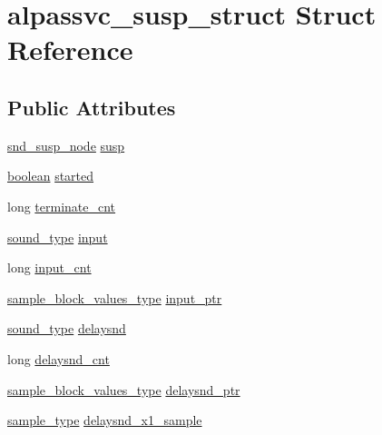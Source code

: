 \hypertarget{structalpassvc__susp__struct}{}\section{alpassvc\+\_\+susp\+\_\+struct Struct Reference}
\label{structalpassvc__susp__struct}
\subsection*{Public Attributes}
\begin{DoxyCompactItemize}
\item 
\hyperlink{sound_8h_a6b268203688a934bd798ceb55f85d4c0}{snd\+\_\+susp\+\_\+node} \hyperlink{structalpassvc__susp__struct_a609c1126e4edd7b9316992f96f955a3b}{susp}
\item 
\hyperlink{cext_8h_a7670a4e8a07d9ebb00411948b0bbf86d}{boolean} \hyperlink{structalpassvc__susp__struct_abd37d6d81e7bbba5a2f9d67c540195b8}{started}
\item 
long \hyperlink{structalpassvc__susp__struct_a9db5735c74407264e582943a8b75ad86}{terminate\+\_\+cnt}
\item 
\hyperlink{sound_8h_a792cec4ed9d6d636d342d9365ba265ea}{sound\+\_\+type} \hyperlink{structalpassvc__susp__struct_a70eda65885d15c88c119725c4bcb9a00}{input}
\item 
long \hyperlink{structalpassvc__susp__struct_a681be947a96f2985a2313f4eb35eac67}{input\+\_\+cnt}
\item 
\hyperlink{sound_8h_a83d17f7b465d1591f27cd28fc5eb8a03}{sample\+\_\+block\+\_\+values\+\_\+type} \hyperlink{structalpassvc__susp__struct_add003c360b741741a12d36190e34242a}{input\+\_\+ptr}
\item 
\hyperlink{sound_8h_a792cec4ed9d6d636d342d9365ba265ea}{sound\+\_\+type} \hyperlink{structalpassvc__susp__struct_ab8ad034a919c5ae32b33c39a3f0cdb97}{delaysnd}
\item 
long \hyperlink{structalpassvc__susp__struct_a39f9bd7932d716e5552d7310eb1f6825}{delaysnd\+\_\+cnt}
\item 
\hyperlink{sound_8h_a83d17f7b465d1591f27cd28fc5eb8a03}{sample\+\_\+block\+\_\+values\+\_\+type} \hyperlink{structalpassvc__susp__struct_a81f640c39b6c3a71a17cd5c6dceb48e0}{delaysnd\+\_\+ptr}
\item 
\hyperlink{sound_8h_a3a9d1d4a1c153390d2401a6e9f71b32c}{sample\+\_\+type} \hyperlink{structalpassvc__susp__struct_a3126cffbf06e8fb4b55f6902764b6f1a}{delaysnd\+\_\+x1\+\_\+sample}
\item 

\end{DoxyCompactItemize}
